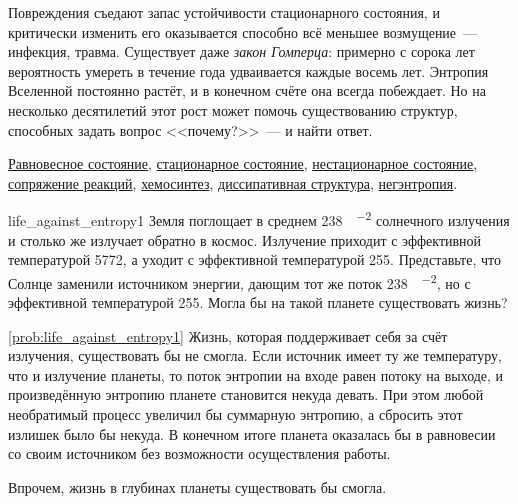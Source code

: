 Повреждения съедают запас устойчивости стационарного состояния, и критически изменить его оказывается способно всё меньшее возмущение~--- инфекция, травма. Существует даже \emph{закон Гомперца}: примерно с сорока лет вероятность умереть в течение года удваивается каждые восемь лет. Энтропия Вселенной постоянно растёт, и в конечном счёте она всегда побеждает. Но на несколько десятилетий этот рост может помочь существованию структур, способных задать вопрос <<почему?>>~--- и найти ответ.

\begin{termlist}
    \hyperref[term:equilibrium_state]{Равновесное состояние},
    \hyperref[term:steady_state]{стационарное состояние},
    \hyperref[term:transient_state]{нестационарное состояние},
    \hyperref[term:reaction_coupling]{сопряжение реакций},
    \hyperref[term:chemosynthesis]{хемосинтез},
    \hyperref[term:dissipative_structure]{диссипативная структура},
    \hyperref[term:negentropy]{негэнтропия}.
\end{termlist}

\begin{problem}{}{life_against_entropy1}
    Земля поглощает в среднем \qty{238}{\ruW\per\ruM\squared} солнечного излучения и столько же излучает обратно в космос. Излучение приходит с эффективной температурой \qty{5772}{\ruK}, а уходит с эффективной температурой \qty{255}{\ruK}. Представьте, что Солнце заменили источником энергии, дающим тот же поток \qty{238}{\ruW\per\ruM\squared}, но с эффективной температурой \qty{255}{\ruK}. Могла бы на такой планете существовать жизнь?
    \begin{sol}{\ref{prob:life_against_entropy1}}
        Жизнь, которая поддерживает себя за счёт излучения, существовать бы не смогла. Если источник имеет ту же температуру, что и излучение планеты, то поток энтропии на входе равен потоку на выходе, и произведённую энтропию планете становится некуда девать. При этом любой необратимый процесс увеличил бы суммарную энтропию, а сбросить этот излишек было бы некуда. В конечном итоге планета оказалась бы в равновесии со своим источником без возможности осуществления работы.

        Впрочем, жизнь в глубинах планеты существовать бы смогла.
    \end{sol}
\end{problem}


